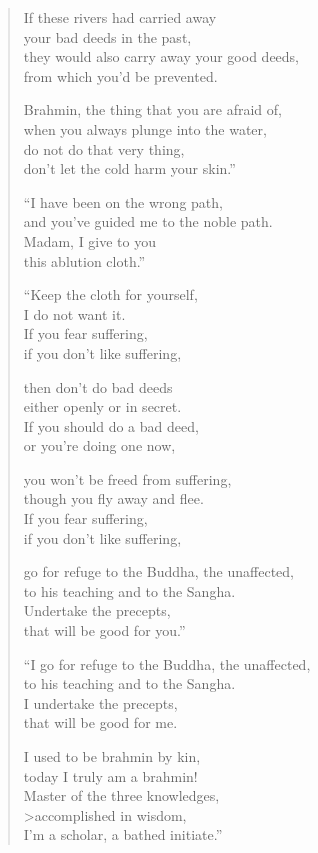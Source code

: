 \documentclass[12pt,openany]{book}%
\begin{document}
\begin{verse}
If these rivers had carried away \\
your bad deeds in the past, \\
they would also carry away your good deeds, \\
from which you’d be prevented. 

Brahmin, the thing that you are afraid of, \\
when you always plunge into the water, \\
do not do that very thing, \\
don’t let the cold harm your skin.” 

“I have been on the wrong path, \\
and you’ve guided me to the noble path. \\
Madam, I give to you \\
this ablution cloth.” 

“Keep the cloth for yourself, \\
I do not want it. \\
If you fear suffering, \\
if you don’t like suffering, 

then don’t do bad deeds \\
either openly or in secret. \\
If you should do a bad deed, \\
or you’re doing one now, 

you won’t be freed from suffering, \\
though you fly away and flee. \\
If you fear suffering, \\
if you don’t like suffering, 

go for refuge to the Buddha, the unaffected, \\
to his teaching and to the Sangha. \\
Undertake the precepts, \\
that will be good for you.” 

“I go for refuge to the Buddha, the unaffected, \\
to his teaching and to the Sangha. \\
I undertake the precepts, \\
that will be good for me. 

I used to be brahmin by kin, \\
today I truly am a brahmin! \\
Master of the three knowledges, \\>accomplished in wisdom, \\
I’m a scholar, a bathed initiate.” 

%
\end{verse}
\end{document}
